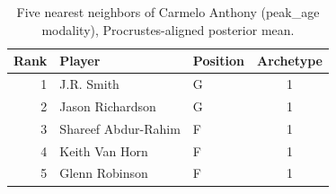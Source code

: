 \begin{table}[htbp]
  \centering\small
  \begin{tabular}{rllc}
    \toprule
    Rank & Player & Position & Archetype \\
    \midrule
    1 & J.R. Smith & G & 1 \\
    2 & Jason Richardson & G & 1 \\
    3 & Shareef Abdur-Rahim & F & 1 \\
    4 & Keith Van Horn & F & 1 \\
    5 & Glenn Robinson & F & 1 \\
    \bottomrule
  \end{tabular}
  \caption{Five nearest neighbors of Carmelo Anthony (peak_age modality), Procrustes-aligned posterior mean.}
  \label{tab:Carmelo_Anthony_neighbors_peak_age}
\end{table}

